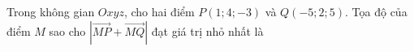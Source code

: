 \begin{ex}
Trong không gian $Oxyz$, cho hai điểm $P(1;4;-3)$ và $Q(-5;2;5)$. Tọa độ của điểm $M$ sao cho $\left|\overrightarrow{MP}+\overrightarrow{MQ}\right|$ đạt giá trị nhỏ nhất là
\end{ex}
